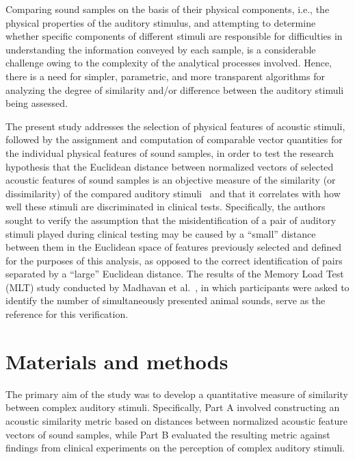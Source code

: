 \documentclass[preprint,12pt]{elsarticle}
\begin{document}
Comparing sound samples on the basis of their physical components, i.e., the physical properties of the auditory stimulus, and attempting to determine whether specific components of different stimuli are responsible for difficulties in understanding the information conveyed by each sample, is a considerable challenge owing to the complexity of the analytical processes involved. Hence, there is a need for simpler, parametric, and more transparent algorithms for analyzing the degree of similarity and/or difference between the auditory stimuli being assessed.

The present study addresses the selection of physical features of acoustic stimuli, followed by the assignment and computation of comparable vector quantities for the individual physical features of sound samples, in order to test the research hypothesis that the Euclidean distance between normalized vectors of selected acoustic features of sound samples is an objective measure of the similarity (or dissimilarity) of the compared auditory stimuli~\cite{MadhavanWrobel2024MLT} and that it correlates with how well these stimuli are discriminated in clinical tests. Specifically, the authors sought to verify the assumption that the misidentification of a pair of auditory stimuli played during clinical testing may be caused by a ``small'' distance between them in the Euclidean space of features previously selected and defined for the purposes of this analysis, as opposed to the correct identification of pairs separated by a ``large'' Euclidean distance. The results of the Memory Load Test (MLT) study conducted by Madhavan et al.~\cite{MadhavanWrobel2024MLT}, in which participants were asked to identify the number of simultaneously presented animal sounds, serve as the reference for this verification.


\section{Materials and methods}
\label{section:mat_met}

The primary aim of the study was to develop a quantitative measure of similarity between complex auditory stimuli. Specifically, Part A involved constructing an acoustic similarity metric based on distances between normalized acoustic feature vectors of sound samples, while Part B evaluated the resulting metric against findings from clinical experiments on the perception of complex auditory stimuli.
\end{document}
